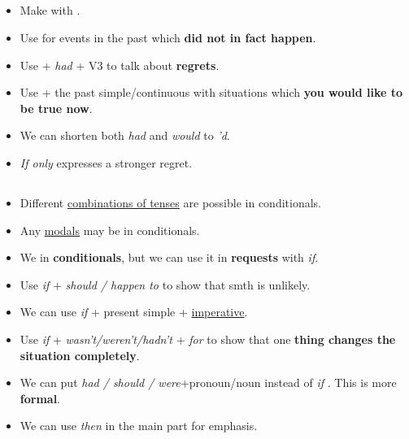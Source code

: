 \subsection{}
\begin{itemize}
    \item[\doot] Make with .
    \item[\doot] Use for events in the past which \textbf{did not in fact happen}.
    \item[\doot] Use  + \textit{had} + V3 to talk about \textbf{regrets}.
    \item[\doot] Use  + the past simple/continuous with situations
    which \textbf{you would like to be true now}.
    \item[\aast] We can shorten both \textit{had} and \textit{would} to \textit{'d}.
    \item[\aast] \textit{If only} expresses a stronger regret.
\end{itemize}

\subsection{}
\begin{itemize}
    \item[\doot] Different \underline{combinations of tenses} are possible in conditionals.
    \item[\doot] Any \underline{modals} may be in conditionals.
    \item[\doot] We  in \textbf{conditionals},
    but we can use it in \textbf{requests} with \textit{if}.
    \item[\doot] Use \textit{if} + \textit{should / happen to} to show that smth is unlikely.
    \item[\doot] We can use \textit{if} + present simple + \underline{imperative}.
    \item[\doot] Use \textit{if} + \textit{wasn't/weren't/hadn't} + \textit{for}
    to show that one \textbf{thing changes the situation completely}.
    \item[\doot] We can put \textit{had / should / were}+pronoun/noun instead of \textit{if} .
    This is more \textbf{formal}.
    \item[\aast] We can use \textit{then} in the main part for emphasis.
\end{itemize}

